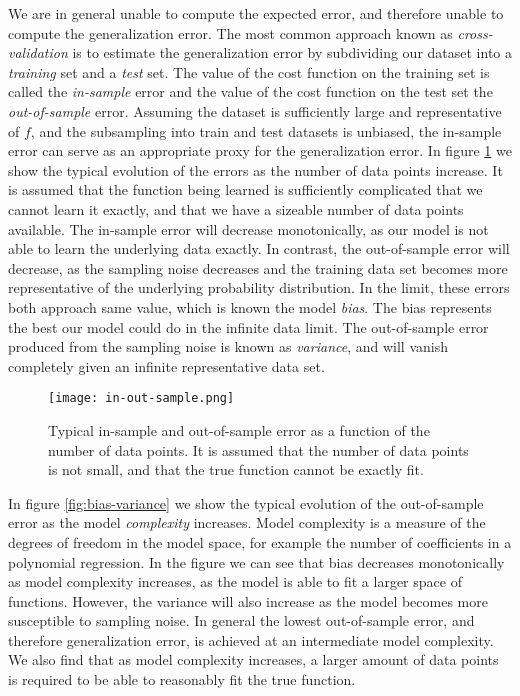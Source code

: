 We are in general unable to compute the expected error, and therefore unable
to compute the generalization error. The most common approach known as
\textit{cross-validation} is to estimate the
generalization error by subdividing our dataset into a \textit{training} set
and a \textit{test} set. The value of the cost function on the training set
is called the \textit{in-sample} error and the value of the cost
function on the test set the \textit{out-of-sample} error.
Assuming the dataset is sufficiently large and representative of $f$, and the subsampling
into train and test datasets is unbiased, the in-sample error
can serve as an appropriate proxy for the generalization error.
\newline
In figure \ref{fig:in-out}
we show the typical evolution of the errors as the number of data points increase.
It is assumed that the function being learned is sufficiently complicated
that we cannot learn it exactly, and that we have a sizeable number of data points
available. The in-sample error will decrease monotonically, as our model
is not able to learn the underlying data exactly. In contrast, the out-of-sample
error will decrease, as the sampling noise decreases and the training
data set becomes more representative of the underlying probability distribution.
In the limit, these errors both approach same value, which is known the model
\textit{bias}. The bias represents the best our model could do in the infinite data limit.
The out-of-sample error produced from the sampling noise
is known as \textit{variance}, and will vanish completely
given an infinite representative data set.

\begin{figure}[h]
    \centering
    \texttt{[image: in-out-sample.png]}
    \caption{Typical in-sample and out-of-sample error as a function
    of the number of data points. It is assumed that the number
    of data points is not small, and that the true function
    cannot be exactly fit.}
    \label{fig:in-out}
\end{figure}

In figure \ref{fig:bias-variance} we show the typical evolution
of the out-of-sample error as the model \textit{complexity} increases.
Model complexity is a measure of the degrees of freedom in the model space,
for example the number of coefficients in a polynomial regression.
In the figure we can see that bias decreases monotonically as model complexity
increases, as the model is able to fit a larger space of functions.
However, the variance will also increase as the model becomes more
susceptible to sampling noise. In general the lowest out-of-sample error,
and therefore generalization error, is achieved at an intermediate
model complexity. We also find that as model complexity increases,
a larger amount of data points is required to be able to reasonably
fit the true function.

